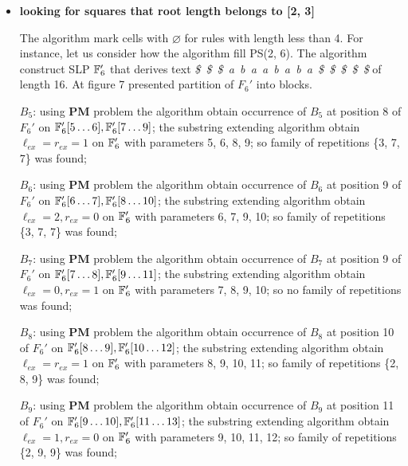 ﻿\documentclass[11pt]{article}
\begin{document}
\begin{appendix}
\begin{itemize}
\begin{figure}[h]
{\begin{tabular}{|c|c|c|c|c|c|c|c|}
	 	[4, 7] & & & & & & & \\ \hline
		\end{tabular}
	  }
  \end{figure}
  
  \item \textbf{looking for squares that root length belongs to [2, 3]}
  
  The algorithm mark cells with $\varnothing$ for rules with length less than 4. For instance, let us consider
  how the algorithm fill PS(2, 6). The algorithm construct SLP $\mathbb{F}_6'$ that derives text
  \emph{\$~\$~\$~a~b~a~a~b~a~b~a~\$~\$~\$~\$~\$} of length 16. At figure 7 presented partition of $F_6'$ into blocks.
  
  \FibonacciWordPartition
  
  $B_5$: using \textbf{PM} problem the algorithm obtain occurrence of $B_5$ at position 8 of $F_6'$ on  
  $\mathbb{F}_{6}'[5\dots6], \mathbb{F}_{6}'[7\dots9]$; the substring extending algorithm obtain $\ell_{ex} = r_{ex} = 1$
  on $\mathbb{F}_{6}'$ with parameters 5, 6, 8, 9; so family of repetitions \{3, 7, 7\} was found;
  
  $B_6$: using \textbf{PM} problem the algorithm obtain occurrence of $B_6$ at position 9 of $F_6'$ on  
  $\mathbb{F}_{6}'[6\dots7], \mathbb{F}_{6}'[8\dots10]$; the substring extending algorithm obtain $\ell_{ex} = 2, r_{ex}
  = 0$ on $\mathbb{F}_{6}'$ with parameters 6, 7, 9, 10; so family of repetitions \{3, 7, 7\} was found;
  
  $B_7$: using \textbf{PM} problem the algorithm obtain occurrence of $B_7$ at position 9 of $F_6'$ on  
  $\mathbb{F}_{6}'[7\dots8], \mathbb{F}_{6}'[9\dots11]$; the substring extending algorithm obtain $\ell_{ex} = 0, r_{ex}
  = 1$ on $\mathbb{F}_{6}'$ with parameters 7, 8, 9, 10; so no family of repetitions was found;
  
  $B_8$: using \textbf{PM} problem the algorithm obtain occurrence of $B_8$ at position 10 of $F_6'$ on  
  $\mathbb{F}_{6}'[8\dots9], \mathbb{F}_{6}'[10\dots12]$; the substring extending algorithm obtain $\ell_{ex} = r_{ex}
  = 1$ on $\mathbb{F}_{6}'$ with parameters 8, 9, 10, 11; so family of repetitions \{2, 8, 9\} was found;
  
  $B_9$: using \textbf{PM} problem the algorithm obtain occurrence of $B_9$ at position 11 of $F_6'$ on  
  $\mathbb{F}_{6}'[9\dots10], \mathbb{F}_{6}'[11\dots13]$; the substring extending algorithm obtain $\ell_{ex} = 1,
  r_{ex} = 0$ on $\mathbb{F}_{6}'$ with parameters 9, 10, 11, 12; so family of repetitions \{2, 9, 9\} was found;
  

\end{itemize}
\end{appendix}
\end{document}
